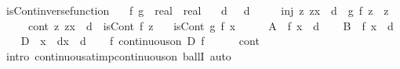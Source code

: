 \begin{isabellebody}
\isamarkupfalse%
\ isCont{\isacharunderscore}{\kern0pt}inverse{\isacharunderscore}{\kern0pt}function{\isacharcolon}{\kern0pt}\isanewline
\ \ \ f\ g\ {\isacharcolon}{\kern0pt}{\isacharcolon}{\kern0pt}\ {\isachardoublequoteopen}real\ {\isasymRightarrow}\ real{\isachardoublequoteclose}\isanewline
\ \ \ d{\isacharcolon}{\kern0pt}\ {\isachardoublequoteopen}{}\ {\isacharless}{\kern0pt}\ d{\isachardoublequoteclose}\isanewline
\ \ \ \ \ inj{\isacharcolon}{\kern0pt}\ {\isachardoublequoteopen}{\isasymAnd}z{\isachardot}{\kern0pt}\ {\isasymbar}z{\isacharminus}{\kern0pt}x{\isasymbar}\ {\isasymle}\ d\ {\isasymLongrightarrow}\ g\ {\isacharparenleft}{\kern0pt}f\ z{\isacharparenright}{\kern0pt}\ {\isacharequal}{\kern0pt}\ z{\isachardoublequoteclose}\isanewline
\ \ \ \ \ cont{\isacharcolon}{\kern0pt}\ {\isachardoublequoteopen}{\isasymAnd}z{\isachardot}{\kern0pt}\ {\isasymbar}z{\isacharminus}{\kern0pt}x{\isasymbar}\ {\isasymle}\ d\ {\isasymLongrightarrow}\ isCont\ f\ z{\isachardoublequoteclose}\isanewline
\ \ \ {\isachardoublequoteopen}isCont\ g\ {\isacharparenleft}{\kern0pt}f\ x{\isacharparenright}{\kern0pt}{\isachardoublequoteclose}\isanewline
%
\isadelimproof
%
\endisadelimproof
%
\isatagproof
{}\isamarkupfalse%
\ {\isacharminus}{\kern0pt}\isanewline
\ \ \isamarkupfalse%
\ {\isacharquery}{\kern0pt}A\ {\isacharequal}{\kern0pt}\ {\isachardoublequoteopen}f\ {\isacharparenleft}{\kern0pt}x\ {\isacharminus}{\kern0pt}\ d{\isacharparenright}{\kern0pt}{\isachardoublequoteclose}\isanewline
\ \ \isamarkupfalse%
\ {\isacharquery}{\kern0pt}B\ {\isacharequal}{\kern0pt}\ {\isachardoublequoteopen}f\ {\isacharparenleft}{\kern0pt}x\ {\isacharplus}{\kern0pt}\ d{\isacharparenright}{\kern0pt}{\isachardoublequoteclose}\isanewline
\ \ \isamarkupfalse%
\ {\isacharquery}{\kern0pt}D\ {\isacharequal}{\kern0pt}\ {\isachardoublequoteopen}{\isacharbraceleft}{\kern0pt}x\ {\isacharminus}{\kern0pt}\ d{\isachardot}{\kern0pt}{\isachardot}{\kern0pt}x\ {\isacharplus}{\kern0pt}\ d{\isacharbraceright}{\kern0pt}{\isachardoublequoteclose}\isanewline
\isanewline
\ \ \isamarkupfalse%
\ f{\isacharcolon}{\kern0pt}\ {\isachardoublequoteopen}continuous{\isacharunderscore}{\kern0pt}on\ {\isacharquery}{\kern0pt}D\ f{\isachardoublequoteclose}\isanewline
\ \ \ \ \isamarkupfalse%
\ cont\ \isamarkupfalse%
\ {\isacharparenleft}{\kern0pt}intro\ continuous{\isacharunderscore}{\kern0pt}at{\isacharunderscore}{\kern0pt}imp{\isacharunderscore}{\kern0pt}continuous{\isacharunderscore}{\kern0pt}on\ ballI{\isacharparenright}{\kern0pt}\ auto\isanewline

\end{isabellebody}
